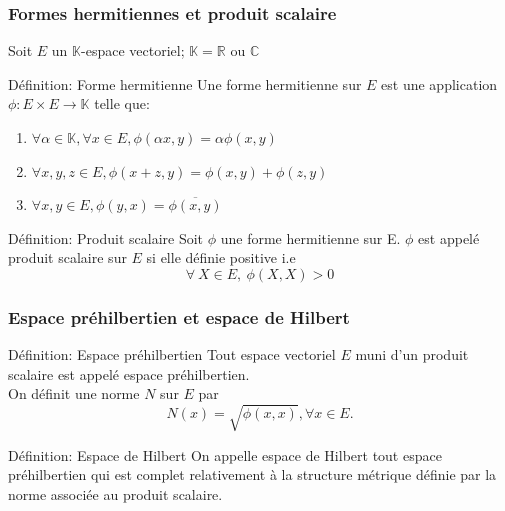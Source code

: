 \documentclass[xcolor=dvipsnames,10pt,mathserif]{beamer}
\theoremstyle{plain}
\newcommand{\R}{\mathbb{R}}
\newcommand{\C}{\mathbb{C}}
\newcommand{\K}{\mathbb{K}}
\begin{document}
 \begin{frame}
\frametitle{Formes hermitiennes et produit scalaire \hfill \insertpagenumber}
Soit $ E $ un $\K$-espace vectoriel; $\K=\R$ ou $\C$


\begin{block}{Définition: Forme hermitienne}
Une forme hermitienne sur $E$ est une application $ \displaystyle{ \phi: E \times E\longrightarrow \K }$ telle que:
\begin{enumerate}
\item $ \forall \alpha \in \K, \forall x \in E, \phi( \alpha x,y ) = \alpha \phi( x,y )$
\item $ \forall x,y,z \in E, \phi( x+z,y ) = \phi( x,y ) + \phi( z,y )$
\item $ \forall x,y \in E, \phi( y,x ) = \overline{\phi( x,y )}$
\end{enumerate}
\end{block}

\pause

\begin{block}{Définition: Produit scalaire}
Soit $\phi$ une forme hermitienne sur E. $\phi$ est appelé produit scalaire sur $E$ si elle définie positive i.e 
\begin{equation}
\forall \ X \in E,\ \phi(X,X)>0
\end{equation}

\end{block}

\end{frame}
\begin{frame} \frametitle{Espace préhilbertien et espace de Hilbert \hfill \insertpagenumber}

\begin{block}{Définition: Espace préhilbertien}
Tout espace vectoriel $E$ muni d'un produit scalaire est appelé espace préhilbertien.
\\On définit une norme $N$ sur $E$ par 
\begin{equation}
N(x) = \sqrt{\phi(x,x)}, \forall x \in E.
\end{equation}
\end{block}

\pause

\begin{block}{Définition: Espace de Hilbert}
On appelle espace de Hilbert tout espace préhilbertien qui est complet relativement à la structure métrique définie par la norme associée au produit scalaire.
\end{block}

\end{frame}
\end{document}
